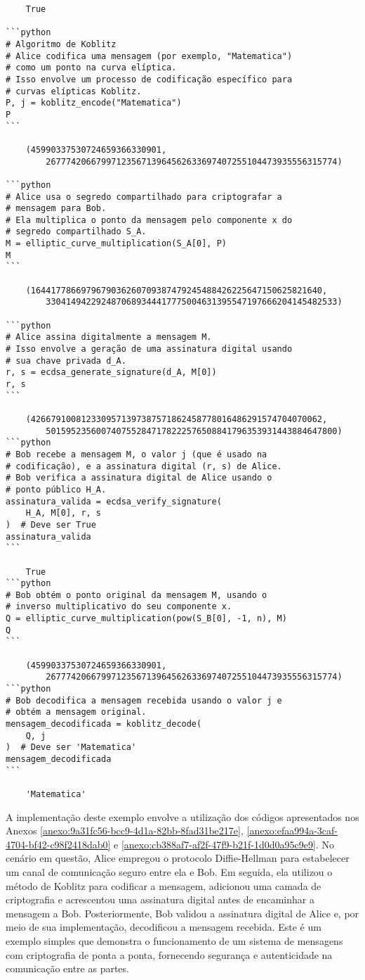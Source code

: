 \begin{verbatim}
	True

```python
# Algoritmo de Koblitz
# Alice codifica uma mensagem (por exemplo, "Matematica")
# como um ponto na curva elíptica.
# Isso envolve um processo de codificação específico para
# curvas elípticas Koblitz.
P, j = koblitz_encode("Matematica")
P
```

	(45990337530724659366330901,
		2677742066799712356713964562633697407255104473935556315774)

```python
# Alice usa o segredo compartilhado para criptografar a
# mensagem para Bob.
# Ela multiplica o ponto da mensagem pelo componente x do
# segredo compartilhado S_A.
M = elliptic_curve_multiplication(S_A[0], P)
M
```

	(1644177866979679036260709387479245488426225647150625821640,
		3304149422924870689344417775004631395547197666204145482533)

```python
# Alice assina digitalmente a mensagem M.
# Isso envolve a geração de uma assinatura digital usando
# sua chave privada d_A.
r, s = ecdsa_generate_signature(d_A, M[0])
r, s
```

	(4266791008123309571397387571862458778016486291574704070062,
		5015952356007407552847178222576508841796353931443884647800)
```python
# Bob recebe a mensagem M, o valor j (que é usado na
# codificação), e a assinatura digital (r, s) de Alice.
# Bob verifica a assinatura digital de Alice usando o
# ponto público H_A.
assinatura_valida = ecdsa_verify_signature(
	H_A, M[0], r, s
)  # Deve ser True
assinatura_valida
```

	True
```python
# Bob obtém o ponto original da mensagem M, usando o
# inverso multiplicativo do seu componente x.
Q = elliptic_curve_multiplication(pow(S_B[0], -1, n), M)
Q
```

	(45990337530724659366330901,
		2677742066799712356713964562633697407255104473935556315774)
```python
# Bob decodifica a mensagem recebida usando o valor j e
# obtém a mensagem original.
mensagem_decodificada = koblitz_decode(
	Q, j
)  # Deve ser 'Matematica'
mensagem_decodificada
```

	'Matematica'
\end{verbatim}

A implementação deste exemplo envolve a utilização dos códigos apresentados nos
Anexos \ref{anexo:9a31fc56-bcc9-4d1a-82bb-8fad31be217e},
\ref{anexo:efaa994a-3caf-4704-bf42-c98f2418dab0} e
\ref{anexo:cb388af7-af2f-47f9-b21f-1d0d0a95c9e9}. No cenário em questão, Alice
empregou o protocolo Diffie-Hellman para estabelecer um canal de comunicação
seguro entre ela e Bob. Em seguida, ela utilizou o método de Koblitz para
codificar a mensagem, adicionou uma camada de criptografia e acrescentou uma
assinatura digital antes de encaminhar a mensagem a Bob. Posteriormente, Bob
validou a assinatura digital de Alice e, por meio de sua implementação,
decodificou a mensagem recebida. Este é um exemplo simples que demonstra o
funcionamento de um sistema de mensagens com criptografia de ponta a ponta,
fornecendo segurança e autenticidade na comunicação entre as partes.

